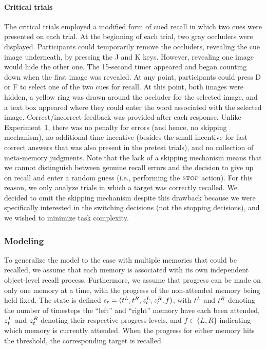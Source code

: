\paragraph{Critical trials} The critical trials employed a modified form of cued recall in which two cues were presented on each trial. At the beginning of each trial, two gray occluders were displayed. Participants could temporarily remove the occluders, revealing the cue image underneath, by pressing the J and K keys. However, revealing one image would hide the other one. The 15-second timer appeared and began counting down when the first image was revealed. At any point, participants could press D or F to select one of the two cues for recall. At this point, both images were hidden, a yellow ring was drawn around the occluder for the selected image, and a text box appeared where they could enter the word associated with the selected image. Correct/incorrect feedback was provided after each response. Unlike Experiment~1, there was no penalty for errors (and hence, no skipping mechanism), no additional time incentive (besides the small incentive for fast correct answers that was also present in the pretest trials), and no collection of meta-memory judgments. Note that the lack of a skipping mechanism means that we cannot distinguish between genuine recall errors and the decision to give up on recall and enter a random guess (i.e., performing the $\textsc{stop}$ action). For this reason, we only analyze trials in which a target was correctly recalled. We decided to omit the skipping mechanism despite this drawback because we were specifically interested in the switching decisions (not the stopping decisions), and we wished to minimize task complexity.


\subsubsection{Modeling}


To generalize the model to the case with multiple memories that could be recalled, we assume that each memory is associated with its own independent object-level recall process. Furthermore, we assume that progress can be made on only one memory at a time, with the progress of the non-attended memory being held fixed. The state is defined $s_t = (t^{L}, t^{R}, z_t^{L}, z_t^{R}, f)$, with $t^{L}$ and $t^{R}$ denoting the number of timesteps the ``left'' and ``right'' memory have each been attended, $z_t^{L}$ and $z_t^{R}$ denoting their respective progress levels, and $f \in \{L, R\}$ indicating which memory is currently attended. When the progress for either memory hits the threshold, the corresponding target is recalled.


